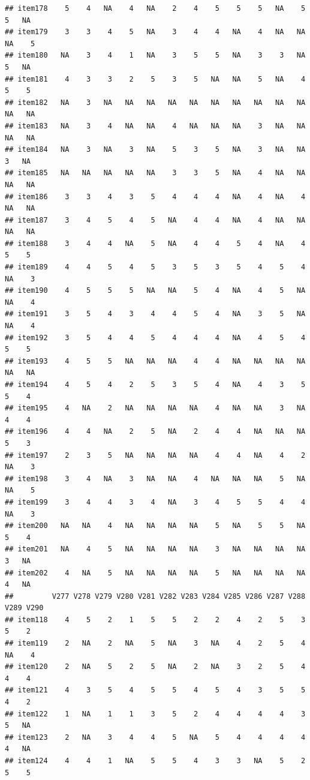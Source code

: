 \documentclass[
  man]{apa6}
\begin{document}
\begin{verbatim}
## item178    5    4   NA    4   NA    2    4    5    5    5   NA    5    5   NA
## item179    3    3    4    5   NA    3    4    4   NA    4   NA   NA   NA    5
## item180   NA    3    4    1   NA    3    5    5   NA    3    3   NA    5   NA
## item181    4    3    3    2    5    3    5   NA   NA    5   NA    4    5    5
## item182   NA    3   NA   NA   NA   NA   NA   NA   NA   NA   NA   NA   NA   NA
## item183   NA    3    4   NA   NA    4   NA   NA   NA    3   NA   NA   NA   NA
## item184   NA    3   NA    3   NA    5    3    5   NA    3   NA   NA    3   NA
## item185   NA   NA   NA   NA   NA    3    3    5   NA    4   NA   NA   NA   NA
## item186    3    3    4    3    5    4    4    4   NA    4   NA    4   NA   NA
## item187    3    4    5    4    5   NA    4    4   NA    4   NA   NA   NA   NA
## item188    3    4    4   NA    5   NA    4    4    5    4   NA    4    5    5
## item189    4    4    5    4    5    3    5    3    5    4    5    4   NA    3
## item190    4    5    5    5   NA   NA    5    4   NA    4    5   NA   NA    4
## item191    3    5    4    3    4    4    5    4   NA    3    5   NA   NA    4
## item192    3    5    4    4    5    4    4    4   NA    4    5    4    5    5
## item193    4    5    5   NA   NA   NA    4    4   NA   NA   NA   NA   NA   NA
## item194    4    5    4    2    5    3    5    4   NA    4    3    5    5    4
## item195    4   NA    2   NA   NA   NA   NA    4   NA   NA    3   NA    4    4
## item196    4    4   NA    2    5   NA    2    4    4   NA   NA   NA    5    3
## item197    2    3    5   NA   NA   NA   NA    4    4   NA    4    2   NA    3
## item198    3    4   NA    3   NA   NA    4   NA   NA   NA    5   NA   NA    5
## item199    3    4    4    3    4   NA    3    4    5    5    4    4   NA    3
## item200   NA   NA    4   NA   NA   NA   NA    5   NA    5    5   NA    5    4
## item201   NA    4    5   NA   NA   NA   NA    3   NA   NA   NA   NA    3   NA
## item202    4   NA    5   NA   NA   NA   NA    5   NA   NA   NA   NA    4   NA
##         V277 V278 V279 V280 V281 V282 V283 V284 V285 V286 V287 V288 V289 V290
## item118    4    5    2    1    5    5    2    2    4    2    5    3    5    2
## item119    2   NA    2   NA    5   NA    3   NA    4    2    5    4   NA    4
## item120    2   NA    5    2    5   NA    2   NA    3    2    5    4    4    4
## item121    4    3    5    4    5    5    4    5    4    3    5    5    4    2
## item122    1   NA    1    1    3    5    2    4    4    4    4    3    5   NA
## item123    2   NA    3    4    4    5   NA    5    4    4    4    4    4   NA
## item124    4    4    1   NA    5    5    4    3    3   NA    5    2    5    5

\end{verbatim}
\end{document}
